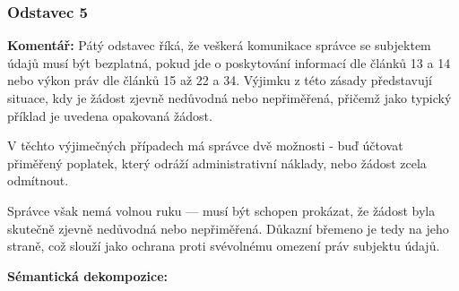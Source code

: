 
\subsubsection{Odstavec 5}
\label{sec:odstavec-5}
\begin{displayquote}  \cite{clanek12}
\end{displayquote}

\noindent \textbf{Komentář:}
Pátý odstavec říká, že veškerá komunikace správce se subjektem údajů musí být bezplatná, pokud jde o poskytování informací dle článků 13 a 14 nebo výkon práv dle článků 15 až 22 a 34. Výjimku z této zásady představují situace, kdy je žádost zjevně nedůvodná nebo nepřiměřená, přičemž jako typický příklad je uvedena opakovaná žádost.

V těchto výjimečných případech má správce dvě možnosti - buď účtovat přiměřený poplatek, který odráží administrativní náklady, nebo žádost zcela odmítnout.

Správce však nemá volnou ruku — musí být schopen prokázat, že žádost byla skutečně zjevně nedůvodná nebo nepřiměřená. Důkazní břemeno je tedy na jeho straně, což slouží jako ochrana proti svévolnému omezení práv subjektu údajů.
\vspace{1em}

\noindent \textbf{Sémantická dekompozice:}

